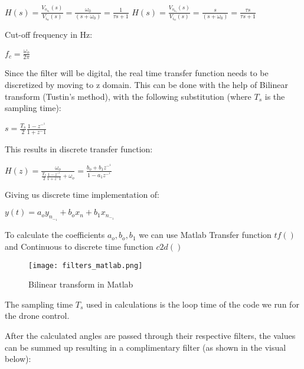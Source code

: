 \center $H(s) = \frac{V_o_u_t(s)}{V_i_n(s)} = \frac{\omega_0}{(s+\omega_0)}= \frac{1}{\tau s+1}$
\center $H(s) = \frac{V_o_u_t(s)}{V_i_n(s)} = \frac{s}{(s+\omega_0)}= \frac{\tau s}{\tau s+1}$

\begin{flushleft}
Cut-off frequency in Hz:
\end{flushleft}
$f_c=\frac{\omega _o}{2\pi}$
\newline
\begin{flushleft}
Since the filter will be digital, the real time transfer function needs to be discretized by moving to z domain. This can be done with the help of Bilinear transform (Tustin's method), with the following substitution (where $T_s$ is the sampling time):
\end{flushleft}
$s=\frac{T_s}{2}\frac{1-z^-^1}{1+z^-1}$

\begin{flushleft}
 This results in discrete transfer function: 
\end{flushleft}

$H(z)= \frac{\omega _o}{\frac{T_s}{2}\frac{1-z^-^1}{1+z^-1} + \omega _o}=\frac{b_o + b_1z^-^1}{1-a_1z^-^1}$

\begin{flushleft}
Giving us discrete time implementation of:  
\end{flushleft}
$y(t)=a_o y_n_-_1+b_ox_n+b_1x_n_-_1  $

\begin{flushleft}
To calculate the coefficients $a_o, b_o, b_1$ we can use Matlab Transfer function $tf()$ and Continuous to discrete time function $c2d() $
\end{flushleft}

\begin{figure}[H]
    \begin{center}
    \texttt{[image: filters\_matlab.png]}
    \end{center}
    \caption{Bilinear transform in Matlab}
    \label{fig:my_label}
\end{figure}


\begin{flushleft}
The sampling time $T_s$ used in calculations is the loop time of the code we run for the drone control.


After the calculated angles are passed through their respective filters, the values can be summed up resulting in a complimentary filter (as shown in the visual below):
\end{flushleft}


